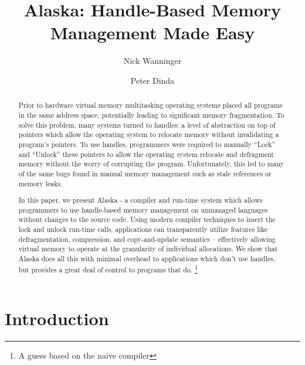 \documentclass[sigplan,screen]{acmart}
\begin{document}
\title{Alaska: Handle-Based Memory \\ Management Made Easy}


\author{Nick Wanninger}

\author{Peter Dinda}

\newcommand{\hbmm}{handle-based memory management~}

\begin{abstract}
Prior to hardware virtual memory multitasking operating systems placed all
programs in the same address space, potentially leading to significant memory
fragmentation. To solve this problem, many systems turned to handles: a level
of abstraction on top of pointers which allow the operating system to
relocate memory without invalidating a program's pointers. To use handles,
programmers were required to manually ``Lock'' and ``Unlock'' these pointers
to allow the operating system relocate and defragment memory without the
worry of corrupting the program. Unfortunately, this led to many of the same
bugs found in manual memory management such as stale references or memory
leaks.

In this paper, we present Alaska - a compiler and run-time system which allows
programmers to use handle-based memory management on unmanaged languages
without changes to the source code. Using modern compiler techniques to
insert the lock and unlock run-time calls, applications can transparently
utilize features like defragmentation, compression, and copy-and-update
semantics -- effectively allowing virtual memory to operate at the
granularity of individual allocations. We show that Alaska does all this with
minimal overhead to applications which don't use handles, but provides a
great deal of control to programs that do.
\footnote{A guess based on the naive compiler}


\end{abstract}


\maketitle


\section{Introduction}
\lipsum[2-4]
\end{document}
